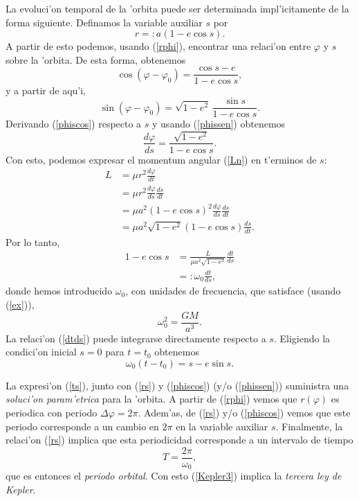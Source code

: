 La evoluci'on temporal de la 'orbita puede ser determinada impl'icitamente de la forma siguiente. Definamos la variable auxiliar $s$ por
\begin{equation}\label{rs}
\boxed{r=:a(1-e\cos s).}
\end{equation}
A partir de esto podemos, usando (\ref{rphi}), encontrar una relaci'on entre $\varphi$ y $s$ sobre la 'orbita. De esta forma, obtenemos
\begin{equation}\label{phiscos}
\boxed{\cos(\varphi-\varphi_0)=\frac{\cos s -e}{1-e\cos s}, }
\end{equation}
y a partir de aqu'i,
\begin{equation}\label{phissen}
\sin(\varphi-\varphi_0)=\sqrt{1-e^2}\,\frac{\sin s}{1-e\cos s}.
\end{equation}
Derivando (\ref{phiscos}) respecto a $s$ y usando (\ref{phissen}) obtenemos
\begin{equation}
\frac{d\varphi}{ds}=\frac{\sqrt{1-e^2}}{1-e\cos s}.
\end{equation}
Con esto, podemos expresar el momentum angular (\ref{Ln}) en t'erminos de $s$:
\begin{align}
L & = \mu r^2 \frac{d\varphi}{dt} \\
& = \mu r^2 \frac{d\varphi}{ds}\frac{ds}{dt} \\
& = \mu a^2\left(1-e\cos s\right)^2 \frac{d\varphi}{ds}\frac{ds}{dt} \\
& = \mu a^2\sqrt{1-e^2}\left(1-e\cos s\right) \frac{ds}{dt} .
\end{align}
Por lo tanto,
\begin{align}
1-e\cos s & = \frac{L}{\mu a^2\sqrt{1-e^2}} \frac{dt}{ds} \\
& =: \omega_0 \frac{dt}{ds}, \label{dtds}
\end{align}
donde hemos introducido $\omega_0$, con unidades de frecuencia, que satisface (usando (\ref{ex})),
\begin{equation}\label{Kepler3}
\boxed{\omega_0^2=\frac{GM}{a^3}.}
\end{equation}
La relaci'on (\ref{dtds}) puede integrarse directamente respecto a $s$. Eligiendo la condici'on inicial $s=0$ para $t=t_0$ obtenemos
\begin{equation}\label{ts}
\boxed{\omega_0(t-t_0)=s-e\sin s.}
\end{equation}

La expresi'on (\ref{ts}), junto con (\ref{rs}) y (\ref{phiscos}) (y/o (\ref{phissen})) suministra una \textit{soluci'on param'etrica} para la 'orbita.
A partir de (\ref{rphi}) vemos que $r(\varphi)$ es periodica con periodo $\Delta\varphi=2\pi$. Adem'as, de (\ref{rs}) y/o (\ref{phiscos}) vemos que este periodo corresponde a un cambio en $2\pi$ en la variable auxiliar $s$. Finalmente, la relaci'on (\ref{rs}) implica que esta periodicidad corresponde a un intervalo de tiempo
\begin{equation}
T=\frac{2\pi}{\omega_0},
\end{equation}
que es entonces el \textit{periodo orbital}. Con esto (\ref{Kepler3}) implica la \textit{tercera ley de Kepler}.